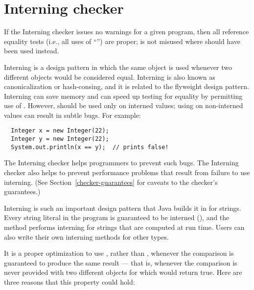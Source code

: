 \htmlhr
\chapter{Interning checker\label{interning-checker}}

If the Interning checker issues no warnings for a given program, then all
reference equality tests (i.e., all uses of ``\code{==}'') are proper;
\code{==} is not misused where  should have been used instead.

Interning is a design pattern in which the same object is used whenever two
different objects would be considered equal.  Interning is also known as
canonicalization or hash-consing, and it is related to the flyweight design
pattern.
Interning can save memory and can speed up testing for
equality by permitting use of \code{==}.  However, \code{==} should be used
only on interned values; using \code{==} on
non-interned values can result in subtle bugs.  For example:

\begin{Verbatim}
  Integer x = new Integer(22);
  Integer y = new Integer(22);
  System.out.println(x == y);  // prints false!
\end{Verbatim}

The Interning checker helps programmers to prevent such bugs.
The Interning checker also helps to prevent performance problems that result
from failure to use interning.
(See Section~\ref{checker-guarantees} for caveats to the checker's guarantees.)

Interning is such an important design pattern that Java builds it in for
strings.  Every string literal in the program is guaranteed to be interned
(), and the
 method
performs interning for strings that are computed at run time.
Users can also write their own interning methods for other types.

It is a proper optimization to use \code{==}, rather than ,
whenever the comparison is guaranteed to produce the same result --- that
is, whenever the comparison is never provided with two different objects
for which  would return true.  Here are three reasons that
this property could hold:

